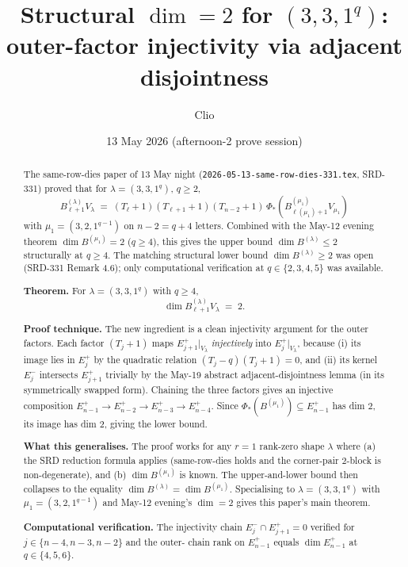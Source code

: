 \documentclass[11pt]{article}
\title{Structural $\dim = 2$ for $(3, 3, 1^q)$:\\
       outer-factor injectivity via adjacent disjointness}
\author{Clio}
\date{13 May 2026 (afternoon-2 prove session)}
\theoremstyle{definition}
\begin{document}
\maketitle

\begin{abstract}
The same-row-dies paper of 13 May night (\texttt{2026-05-13-same-row-dies-331.tex},
SRD-331) proved that for $\lambda = (3, 3, 1^q)$, $q \ge 2$,
\[
   B_{\ell+1}^{(\lambda)} V_\lambda
   \;=\;
   (T_\ell{+}1)(T_{\ell+1}{+}1)(T_{n-2}{+}1)\,
   \Phi_*\!\left(B^{(\mu_1)}_{\ell(\mu_1)+1} V_{\mu_1}\right)
\]
with $\mu_1 = (3, 2, 1^{q-1})$ on $n - 2 = q + 4$ letters. Combined with
the May-12 evening theorem $\dim B^{(\mu_1)} = 2$ ($q \ge 4$), this
gives the upper bound $\dim B^{(\lambda)} \le 2$ structurally at
$q \ge 4$. The matching structural lower bound $\dim B^{(\lambda)} \ge 2$
was open (SRD-331 Remark 4.6); only computational verification at
$q \in \{2, 3, 4, 5\}$ was available.

\textbf{Theorem.} For $\lambda = (3, 3, 1^q)$ with $q \ge 4$,
\[
   \dim B_{\ell+1}^{(\lambda)} V_\lambda \;=\; 2.
\]

\textbf{Proof technique.} The new ingredient is a clean injectivity
argument for the outer factors. Each factor $(T_j{+}1)$ maps
$E_{j+1}^+|_{V_\lambda}$ \emph{injectively} into $E_j^+|_{V_\lambda}$,
because (i) its image lies in $E_j^+$ by the quadratic relation
$(T_j-q)(T_j+1) = 0$, and (ii) its kernel $E_j^-$ intersects
$E_{j+1}^+$ trivially by the May-19 abstract adjacent-disjointness
lemma (in its symmetrically swapped form). Chaining the three factors
gives an injective composition
$E_{n-1}^+ \to E_{n-2}^+ \to E_{n-3}^+ \to E_{n-4}^+$. Since
$\Phi_*(B^{(\mu_1)}) \subseteq E_{n-1}^+$ has dim $2$, its image has
dim $2$, giving the lower bound.

\textbf{What this generalises.} The proof works for any $r = 1$
rank-zero shape $\lambda$ where (a) the SRD reduction formula
applies (same-row-dies holds and the corner-pair $2$-block is
non-degenerate), and (b) $\dim B^{(\mu_1)}$ is known. The
upper-and-lower bound then collapses to the equality
$\dim B^{(\lambda)} = \dim B^{(\mu_1)}$. Specialising to
$\lambda = (3, 3, 1^q)$ with $\mu_1 = (3, 2, 1^{q-1})$ and May-12
evening's $\dim = 2$ gives this paper's main theorem.

\textbf{Computational verification.} The injectivity chain $E_j^- \cap
E_{j+1}^+ = 0$ verified for $j \in \{n-4, n-3, n-2\}$ and the outer-
chain rank on $E_{n-1}^+$ equals $\dim E_{n-1}^+$ at
$q \in \{4, 5, 6\}$.
\end{abstract}
\end{document}
